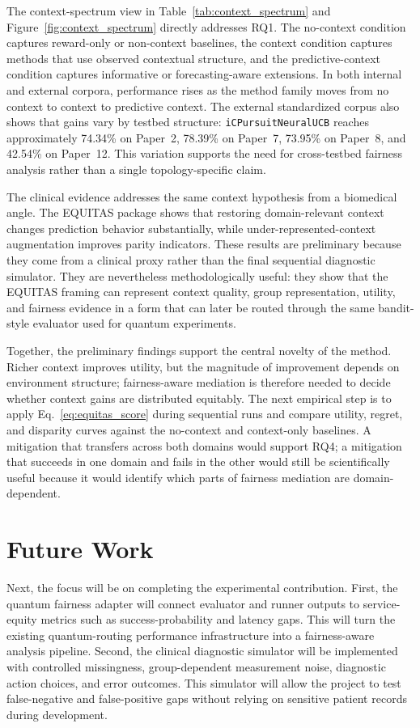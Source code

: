 \documentclass[conference]{IEEEtran}
\begin{document}
The context-spectrum view in Table~\ref{tab:context_spectrum} and
Figure~\ref{fig:context_spectrum} directly addresses RQ1. The no-context
condition captures reward-only or non-context baselines, the context condition
captures methods that use observed contextual structure, and the
predictive-context condition captures informative or forecasting-aware
extensions. In both internal and external corpora, performance rises as the
method family moves from no context to context to predictive context. The
external standardized corpus also shows that gains vary by testbed structure:
\texttt{iCPursuitNeuralUCB} reaches approximately 74.34\% on Paper~2, 78.39\%
on Paper~7, 73.95\% on Paper~8, and 42.54\% on Paper~12. This variation
supports the need for cross-testbed fairness analysis rather than a single
topology-specific claim.

The clinical evidence addresses the same context hypothesis from a biomedical
angle. The EQUITAS package shows that restoring domain-relevant context changes
prediction behavior substantially, while under-represented-context
augmentation improves parity indicators. These results are preliminary because
they come from a clinical proxy rather than the final sequential diagnostic
simulator. They are nevertheless methodologically useful: they show that the
EQUITAS framing can represent context quality, group representation, utility,
and fairness evidence in a form that can later be routed through the same
bandit-style evaluator used for quantum experiments.

Together, the preliminary findings support the central novelty of the method.
Richer context improves utility, but the magnitude of improvement depends on
environment structure; fairness-aware mediation is therefore needed to decide
whether context gains are distributed equitably. The next empirical step is to
apply Eq.~\ref{eq:equitas_score} during sequential runs and compare utility,
regret, and disparity curves against the no-context and context-only
baselines. A mitigation that transfers across both domains would support RQ4;
a mitigation that succeeds in one domain and fails in the other would still be
scientifically useful because it would identify which parts of fairness
mediation are domain-dependent.

\section{Future Work}
Next, the focus will be on completing the experimental contribution. First,
the quantum fairness adapter will connect evaluator and runner outputs to
service-equity metrics such as success-probability and latency gaps. This will
turn the existing quantum-routing performance infrastructure into a
fairness-aware analysis pipeline. Second, the clinical diagnostic simulator
will be implemented with controlled missingness, group-dependent measurement
noise, diagnostic action choices, and error outcomes. This simulator will allow
the project to test false-negative and false-positive gaps without relying on
sensitive patient records during development.
\end{document}
